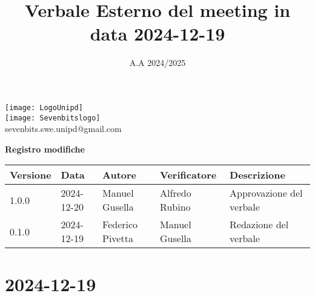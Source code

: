 \documentclass[10pt]{article}
\title{Verbale Esterno del meeting in data 2024-12-19}
\date{A.A 2024/2025}
\begin{document}
\maketitle
\begin{center}
\texttt{[image: LogoUnipd]}\\
\texttt{[image: Sevenbitslogo]}\\
sevenbits.swe.unipd@gmail.com\\
\vspace{2mm}

\textbf{Registro modifiche}\\
\vspace{2mm}
\begin{tabularx}{\textwidth}{|l|l|l|l|X|}
\hline
\textbf{Versione} & \textbf{Data} & \textbf{Autore} & \textbf{Verificatore} & \textbf{Descrizione} \\
\hline
1.0.0 & 2024-12-20 & Manuel Gusella & Alfredo Rubino & Approvazione del verbale\\
\hline
0.1.0 & 2024-12-19 & Federico Pivetta & Manuel Gusella & Redazione del verbale\\
\hline
\end{tabularx}
\end{center}

\newpage
\tableofcontents

\newpage
\section{2024-12-19}
\end{document}
